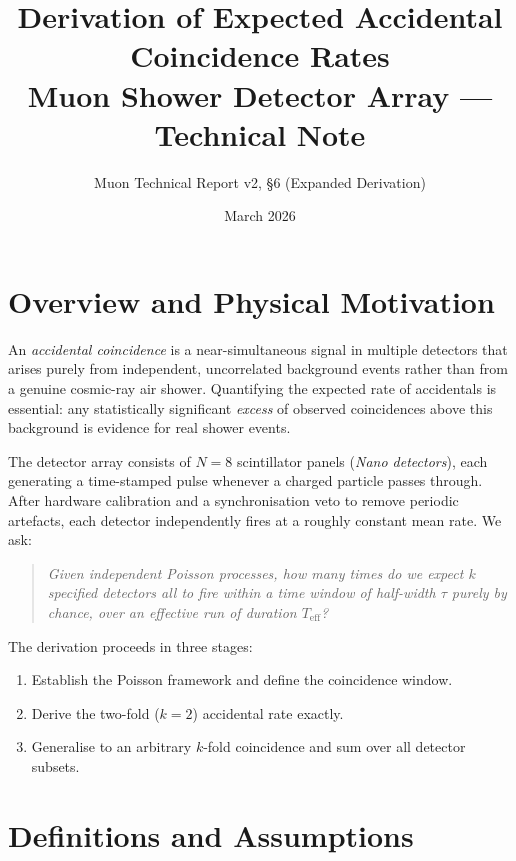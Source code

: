 \documentclass[12pt]{article}
\title{\textbf{Derivation of Expected Accidental Coincidence Rates}\\[6pt]
       \large Muon Shower Detector Array --- Technical Note}
\author{Muon Technical Report v2, \S6 (Expanded Derivation)}
\date{March 2026}
\theoremstyle{definition}
\newcommand{\Teff}{T_{\!\text{eff}}}
\begin{document}
\maketitle
\tableofcontents
\newpage

\section{Overview and Physical Motivation}

An \textit{accidental coincidence} is a near-simultaneous signal in
multiple detectors that arises purely from independent, uncorrelated
background events rather than from a genuine cosmic-ray air shower.
Quantifying the expected rate of accidentals is essential: any
statistically significant \emph{excess} of observed coincidences above
this background is evidence for real shower events.

The detector array consists of $N = 8$ scintillator panels (\emph{Nano
detectors}), each generating a time-stamped pulse whenever a charged
particle passes through.  After hardware calibration and a synchronisation
veto to remove periodic artefacts, each detector independently fires at a
roughly constant mean rate.  We ask:

\begin{quote}
\itshape
Given independent Poisson processes, how many times do we expect $k$
specified detectors all to fire within a time window of half-width $\tau$
purely by chance, over an effective run of duration $\Teff$?
\end{quote}

The derivation proceeds in three stages:
\begin{enumerate}
    \item Establish the Poisson framework and define the coincidence window.
    \item Derive the two-fold ($k=2$) accidental rate exactly.
    \item Generalise to an arbitrary $k$-fold coincidence and sum over
          all detector subsets.
\end{enumerate}

\section{Definitions and Assumptions}
\end{document}
